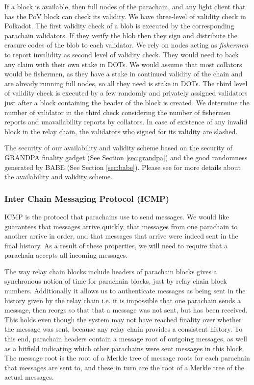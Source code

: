 If a block is available, then full nodes of the parachain, and any light client that has the PoV block can check its validity. We have three-level of validity check in Polkadot. The first validity check of a blob is executed by the corresponding parachain validators. If they verify the blob then they sign and distribute the erasure codes of the blob to each validator. 
We rely on nodes acting as {\em fishermen} to report invalidity as second level of validity check. They would need to back any claim with their own stake in DOTs. We would assume that most collators would be fishermen, as they have a stake in continued validity of the chain and are already running full nodes, so all they need is stake in DOTs. The third level of validity check is executed by a few randomly and privately assigned validators just after a block containing the header of the block is created. We determine the number of validator in the third check considering the number of fishermen reports and unavailability reports by collators. In case of existence of any invalid block in the relay chain, the validators who signed for its validity are slashed.

The security of our availability and validity scheme based on the security of GRANDPA finality gadget (See Section \ref{sec:grandpa}) and the good randomness generated by BABE (See Section \ref{sec:babe}). Please see \cite{availandvalid} for more details about the availability and validity scheme.


\subsubsection{Inter Chain Messaging Protocol (ICMP)} \label{sec:ICMP}

ICMP is the protocol that parachains use to send messages.
We would like guarantees that messages arrive quickly, that messages from one parachain to another arrive in order,
and that messages that arrive were indeed sent in the final history.
As a result of these properties, we will need to require that a parachain accepts all incoming messages.

The way relay chain blocks include headers of parachain blocks gives a synchronous notion of time for parachain blocks,
just by relay chain block numbers.
Additionally it allows us to authenticate messages as being sent in the history given by the relay chain
i.e. it is impossible that one parachain sends a message,
then reorgs so that that a message was not sent, but has been received.
This holds even though the system may not have reached finality over whether the message was sent, because any relay chain provides a consistent history.
To this end, parachain headers contain a message root of outgoing messages, as well as a bitfield indicating which other parachains were sent messages in this block.
The message root is the root of a Merkle tree of message roots for each parachain that messages are sent to,
and these in turn are the root of a Merkle tree of the actual messages.

